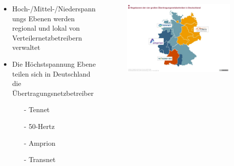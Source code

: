 \documentclass[aspectratio=1610, professionalfonts, 9pt]{beamer}
\begin{document}
\begin{frame}
  \begin{columns}
    \begin{column}{0.5\textwidth}
  \begin{itemize}
    \item Hoch-/Mittel-/Niederspannungs Ebenen
     werden regional und lokal von Verteilernetzbetreibern verwaltet
    \item Die Höchstspannung Ebene teilen sich in
    Deutschland die Übertragungsnetzbetreiber
    \begin{itemize}
      \item[-] Tennet
      \item[-] 50-Hertz
      \item[-] Amprion
      \item[-] Transnet
  \end{itemize}
\end{itemize}
\end{column}
\begin{column}{0.5\textwidth}
\begin{figure}
    \includegraphics[width=1\textwidth]{images/UNB.jpg}
\end{figure}
\end{column}
\end{columns}
\end{frame}
\end{document}
